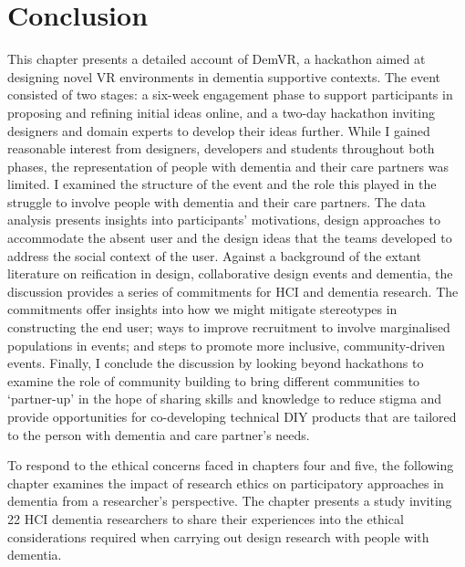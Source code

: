 \section{Conclusion}
\label{sec:Conclusion}
This chapter presents a detailed account of DemVR, a hackathon aimed at designing novel VR environments in dementia supportive contexts. The event consisted of two stages: a six-week engagement phase to support participants in proposing and refining initial ideas online, and a two-day hackathon inviting designers and domain experts to develop their ideas further. While I gained reasonable interest from designers, developers and students throughout both phases, the representation of people with dementia and their care partners was limited. I examined the structure of the event and the role this played in the struggle to involve people with dementia and their care partners. The data analysis presents insights into participants’ motivations, design approaches to accommodate the absent user and the design ideas that the teams developed to address the social context of the user. Against a background of the extant literature on reification in design, collaborative design events and dementia, the discussion provides a series of commitments for HCI and dementia research. The commitments offer insights into how we might mitigate stereotypes in constructing the end user; ways to improve recruitment to involve marginalised populations in events; and steps to promote more inclusive, community-driven events. Finally, I conclude the discussion by looking beyond hackathons to examine the role of community building to bring different communities to `partner-up' in the hope of sharing skills and knowledge to reduce stigma and provide opportunities for co-developing technical DIY products that are tailored to the person with dementia and care partner’s needs.

To respond to the ethical concerns faced in chapters four and five, the following chapter examines the impact of research ethics on participatory approaches in dementia from a researcher's perspective. The chapter presents a study inviting 22 HCI dementia researchers to share their experiences into the ethical considerations required when carrying out design research with people with dementia.



